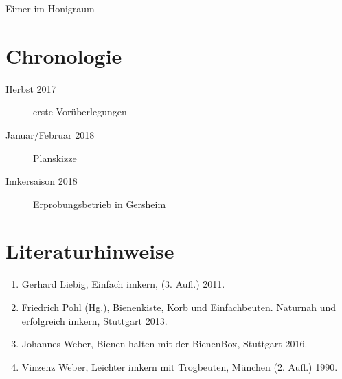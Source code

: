 \documentclass[12pt,a4paper,ngerman]{scrartcl}
\begin{document}
Eimer im Honigraum


\section{Chronologie}

\begin{description}
\item[Herbst 2017] erste Vorüberlegungen
\item[Januar/Februar 2018] Planskizze
\item[Imkersaison 2018] Erprobungsbetrieb in Gersheim
\end{description}


\section{Literaturhinweise}

\begin{enumerate}
\item Gerhard Liebig, Einfach imkern, (3. Aufl.) 2011.
\item Friedrich Pohl (Hg.), Bienenkiste, Korb und Einfachbeuten. Naturnah und erfolgreich imkern, Stuttgart 2013.
\item Johannes Weber, Bienen halten mit der BienenBox, Stuttgart 2016.
\item Vinzenz Weber, Leichter imkern mit Trogbeuten, München (2. Aufl.) 1990.
\end{enumerate}
\end{document}
